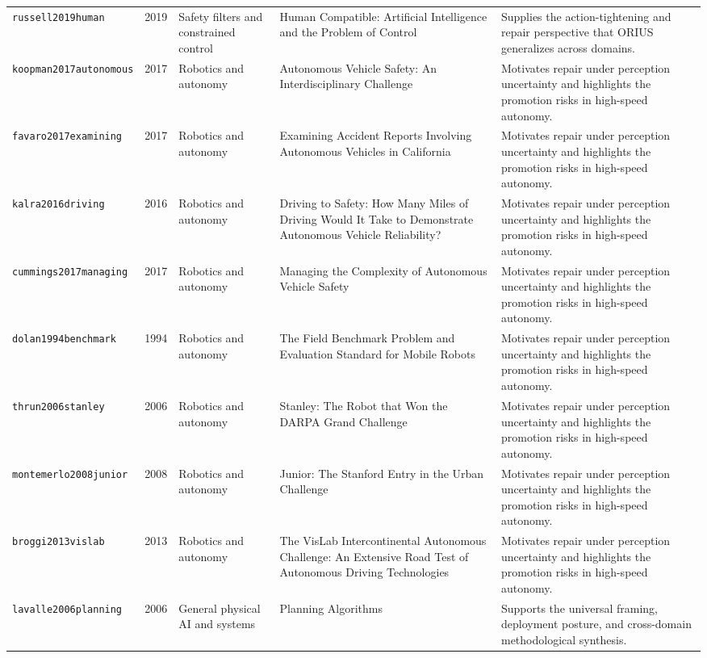 \begin{longtable}{p{}p{}p{}p{}p{}}
\texttt{russell2019human} & 2019 & Safety filters and constrained control & Human Compatible: Artificial Intelligence and the Problem of Control & Supplies the action-tightening and repair perspective that ORIUS generalizes across domains.\\
\texttt{koopman2017autonomous} & 2017 & Robotics and autonomy & Autonomous Vehicle Safety: An Interdisciplinary Challenge & Motivates repair under perception uncertainty and highlights the promotion risks in high-speed autonomy.\\
\texttt{favaro2017examining} & 2017 & Robotics and autonomy & Examining Accident Reports Involving Autonomous Vehicles in California & Motivates repair under perception uncertainty and highlights the promotion risks in high-speed autonomy.\\
\texttt{kalra2016driving} & 2016 & Robotics and autonomy & Driving to Safety: How Many Miles of Driving Would It Take to Demonstrate Autonomous Vehicle Reliability? & Motivates repair under perception uncertainty and highlights the promotion risks in high-speed autonomy.\\
\texttt{cummings2017managing} & 2017 & Robotics and autonomy & Managing the Complexity of Autonomous Vehicle Safety & Motivates repair under perception uncertainty and highlights the promotion risks in high-speed autonomy.\\
\texttt{dolan1994benchmark} & 1994 & Robotics and autonomy & The Field Benchmark Problem and Evaluation Standard for Mobile Robots & Motivates repair under perception uncertainty and highlights the promotion risks in high-speed autonomy.\\
\texttt{thrun2006stanley} & 2006 & Robotics and autonomy & Stanley: The Robot that Won the DARPA Grand Challenge & Motivates repair under perception uncertainty and highlights the promotion risks in high-speed autonomy.\\
\texttt{montemerlo2008junior} & 2008 & Robotics and autonomy & Junior: The Stanford Entry in the Urban Challenge & Motivates repair under perception uncertainty and highlights the promotion risks in high-speed autonomy.\\
\texttt{broggi2013vislab} & 2013 & Robotics and autonomy & The VisLab Intercontinental Autonomous Challenge: An Extensive Road Test of Autonomous Driving Technologies & Motivates repair under perception uncertainty and highlights the promotion risks in high-speed autonomy.\\
\texttt{lavalle2006planning} & 2006 & General physical AI and systems & Planning Algorithms & Supports the universal framing, deployment posture, and cross-domain methodological synthesis.\\

\end{longtable}

